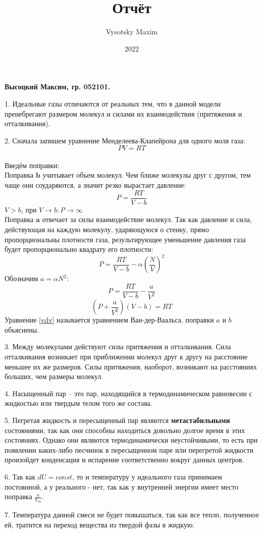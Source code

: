 \documentclass[a4paper,12pt]{article}
\author{Vysotsky Maxim}
\title{Отчёт}
\date{2022}
\begin{document}
	\textbf{Высоцкий Максим, гр. 052101.}
	
	1. Идеальные газы отличаются от реальных тем, что в данной модели пренебрегают размером молекул и силами их взаимодействия (притяжения и отталкивания).
	
	2. Сначала запишем уравнение Менделеева-Клапейрона для одного моля газа:
	$$PV = RT$$\\
	Введём поправки:\\ 
	Поправка $\textbf{b}$ учитывает объем молекул. Чем ближе
	молекулы друг с другом, тем чаще они соударяются, а значит резко
	вырастает давление: 
	$$P = \frac{RT}{V-b}$$
	$V > b$, при $V \rightarrow b: P \rightarrow \infty$\\
	Поправка $\textbf{a}$ отвечает за силы взаимодействие молекул.
	Так как давление и сила, действующая на каждую молекулу,
	ударяющуюся о стенку, прямо пропорциональны плотности газа,
	результирующее уменьшение давления газа будет пропорционально квадрату
	его плотности:
	$$P = \frac{RT}{V-b} - \alpha(\frac{N}{V})^2$$
	Обозначим $a = \alpha N^2$:
	$$P = \frac{RT}{V-b} - \frac{a}{V^2} $$
	\begin{equation}\label{vdv}
	(P + \frac{a}{V^2})(V-b) = RT
	\end{equation}
	Уравнение \eqref{vdv} называется уравнением Ван-дер-Ваальса, поправки $a$ и $b$ объяснены.
	
	3. Между молекулами действуют силы притяжения и отталкивания. Сила отталкивания возникает при приближении молекул друг к другу на расстояние меньшее их же размеров. Силы притяжения, наоборот, возникают на расстояниях больших, чем размеры молекул.
	
	4. Насыщенный пар – это пар, находящийся в термодинамическом равновесии с жидкостью или твердым телом того же состава.
	
	5. Пегретая жидкость и пересыщенный пар являются \textbf{метастабильными } состояниями, так как они способны находиться довольно долгое время в этих состояниях. Однако они являются термодинамически неустойчивыми, то есть при появлении каких-либо песчинок в пересыщенном паре или перегретой жидкости произойдет конденсация и испарение соответственно вокруг данных центров.
	
	6. Так как $dU = const$, то и температуру у идеального газа принимаем постоянной, а у реального - нет, так как у внутренней энергии имеет место поправка $\frac{a}{V_m}$.
	
	7. Температура данной смеси не будет повышаться, так как все тепло, полученное ей, тратится на переход вещества из твердой фазы в жидкую.
	
\end{document}
